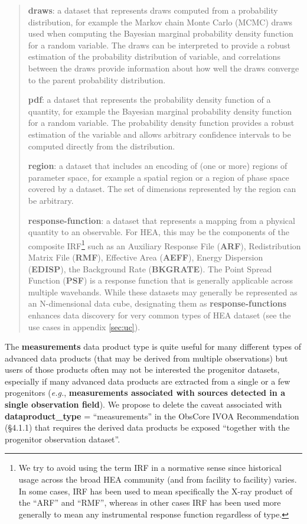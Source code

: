 \documentclass[11pt,a4paper]{ivoa}
\begin{document}
\begin{quote}
{\bf draws}: a dataset that represents draws computed from a probability distribution, for example the Markov chain Monte Carlo (MCMC) draws used when computing the Bayesian marginal probability density function for a random variable. The draws
can be interpreted to provide a robust estimation of the probability distribution of variable, and correlations between the draws provide information about how well the draws converge to the parent probability distribution.

{\bf pdf}: a dataset that represents the probability density function of a quantity, for example the Bayesian marginal probability density  function for a random variable. The probability density function provides a robust estimation of the variable and allows arbitrary confidence intervals to be computed directly from the distribution.

{\bf region}: a dataset that includes an encoding of (one or more) regions of parameter space, for example a spatial region or a region of phase space covered by a dataset. The set of dimensions represented by the region can be arbitrary.

{\bf response-function}: a dataset that represents a mapping from a physical quantity to an observable. For \gls{HEA}, this may be the components of the composite \gls{IRF}\footnote{We try to avoid using the term \gls{IRF} in a normative sense since historical usage across the broad \gls{HEA} community (and from facility to facility) varies. In some cases, \gls{IRF} has been used to mean specifically the X-ray product of the ``ARF'' and ``RMF'', whereas in other cases \gls{IRF}
has been used more generally to mean any instrumental response function regardless of type.} such as an Auxiliary Response File ({\bf ARF}), Redistribution Matrix File ({\bf RMF}), Effective Area ({\bf AEFF}), Energy Dispersion ({\bf EDISP}), the Background Rate ({\bf BKGRATE}). The Point Spread Function ({\bf PSF}) is a response function that is generally applicable across multiple wavebands. While these datasets may generally be represented as an N-dimensional data cube, designating them as {\bf response-functions} enhances data discovery for very common types of \gls{HEA} dataset (see the use cases in appendix \ref{sec:uc}).

\end{quote}

The {\bf measurements} data product type is quite useful for many different types of advanced data products (that may be derived from multiple observations) but users of those products often may not be interested the progenitor datasets, especially if many advanced data products are extracted from a single or a few progenitors ({\em e.g.\/}, {\bf measurements associated with sources detected in a single observation field}). We propose to delete the caveat associated with {\bf dataproduct\_type} = ``measurements'' in the ObsCore IVOA Recommendation (\S4.1.1) that requires the derived data products be exposed ``together with the progenitor observation dataset''.\\
\end{document}
